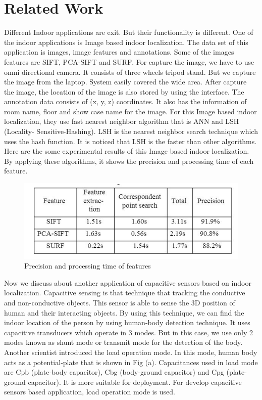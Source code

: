 \section{Related Work}
Different Indoor applications are exit. But their functionality is different. One of the indoor applications is Image based indoor localization. The data set of this application is images, image features and annotations. Some of the images features are SIFT, PCA-SIFT and SURF.  For capture the image, we have to use omni directional camera. It consists of three wheels tripod stand. But we capture the image from the laptop. System easily covered the wide area. After capture the image, the location of the image is also stored by using the interface. The annotation data consists of (x, y, z) coordinates. It also has the information of room name, floor and show case name for the image. 
For this Image based indoor localization, they use fast nearest neighbor algorithm that is ANN and LSH (Locality- Sensitive-Hashing). LSH is the nearest neighbor search technique which uses the hash function. It is noticed that LSH is the faster than other algorithms.
Here are the some experimental results of this Image based indoor localization. By applying these algorithms, it shows the precision and processing time of each feature.


\begin{figure}[h]
  		\centering
    		\includegraphics[scale=0.8]{./Figures/feature}
\caption{Precision and processing time of features}
\label{fig:1}
 		\end{figure}

Now we discuss about another application of capacitive sensors based on indoor localization. Capacitive sensing is that technique that tracking the conductive and non-conductive objects. This sensor is able to sense the 3D position of human and their interacting objects. 
 By using this technique, we can find the indoor location of the person by using human-body detection technique. It uses capacitive transducers which operate in 3 modes. But in this case, we use only 2 modes known as shunt mode or transmit mode for the detection of the body. Another scientist introduced the load operation mode. In this mode, human body acts as a potential-plate that is shown in Fig (a). Capacitances used in load mode are Cpb (plate-body capacitor), Cbg (body-ground capacitor) and Cpg (plate-ground capacitor). It is more suitable for deployment. For develop capacitive sensors based application, load operation mode is used.


